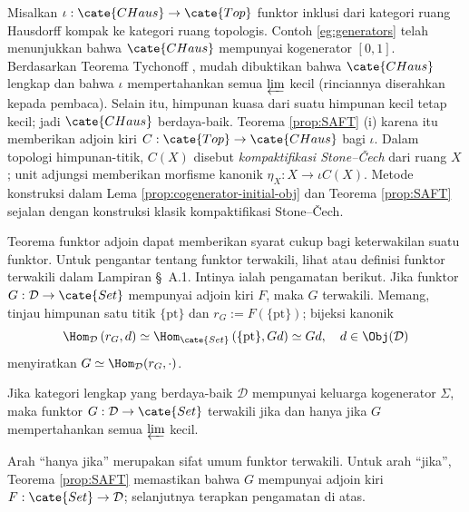 \begin{contoh}
	Misalkan $\iota:\cate{CHaus}\to\cate{Top}$ funktor inklusi dari kategori
	ruang Hausdorff kompak ke kategori ruang topologis. Contoh
	\ref{eg:generators} telah menunjukkan bahwa $\cate{CHaus}$ mempunyai
	kogenerator $[0,1]$. Berdasarkan Teorema Tychonoff
	\cite[Teorema 7.7.2]{Xiong}, mudah dibuktikan bahwa $\cate{CHaus}$ lengkap dan
	bahwa $\iota$ mempertahankan semua $\varprojlim$ kecil (rinciannya
	diserahkan kepada pembaca). Selain itu, himpunan kuasa dari suatu himpunan
	kecil tetap kecil; jadi $\cate{CHaus}$ berdaya-baik. Teorema
	\ref{prop:SAFT} (i) karena itu memberikan adjoin kiri
	$C:\cate{Top}\to\cate{CHaus}$ bagi $\iota$. Dalam topologi himpunan-titik,
	$C(X)$ disebut \emph{kompaktifikasi Stone--Čech} dari ruang $X$; unit
	adjungsi memberikan morfisme kanonik $\eta_X:X\to\iota C(X)$. Metode
	konstruksi dalam Lema \ref{prop:cogenerator-initial-obj} dan Teorema
	\ref{prop:SAFT} sejalan dengan konstruksi klasik kompaktifikasi
	Stone--Čech.
\end{contoh}

Teorema funktor adjoin dapat memberikan syarat cukup bagi keterwakilan suatu
funktor. Untuk pengantar tentang funktor terwakili, lihat
\cite[Definisi 2.5.2]{Li1} atau definisi funktor terwakili dalam
Lampiran \S~A.1.
Intinya ialah pengamatan berikut. Jika funktor
$G:\mathcal{D}\to\cate{Set}$ mempunyai adjoin kiri $F$, maka $G$
terwakili. Memang, tinjau himpunan satu titik $\{\mathrm{pt}\}$ dan
$r_G:=F(\{\mathrm{pt}\})$; bijeksi kanonik
\[ \Hom_{\mathcal{D}}\left( r_G, d \right) \simeq \Hom_{\cate{Set}}\left( \{\mathrm{pt}\}, Gd \right) \simeq Gd , \quad d \in \Obj(\mathcal{D}) \]
menyiratkan $G\simeq\Hom_{\mathcal{D}}(r_G,\cdot)$.

\begin{korolari}\label{prop:cogenerator-representability}
	Jika kategori lengkap yang berdaya-baik $\mathcal{D}$ mempunyai keluarga
	kogenerator $\Sigma$, maka funktor $G:\mathcal{D}\to\cate{Set}$
	terwakili jika dan hanya jika $G$ mempertahankan semua $\varprojlim$ kecil.
\end{korolari}
\begin{bukti}
	Arah ``hanya jika'' merupakan sifat umum funktor terwakili. Untuk arah
	``jika'', Teorema \ref{prop:SAFT} memastikan bahwa $G$ mempunyai adjoin
	kiri $F:\cate{Set}\to\mathcal{D}$; selanjutnya terapkan pengamatan di atas.
\end{bukti}

